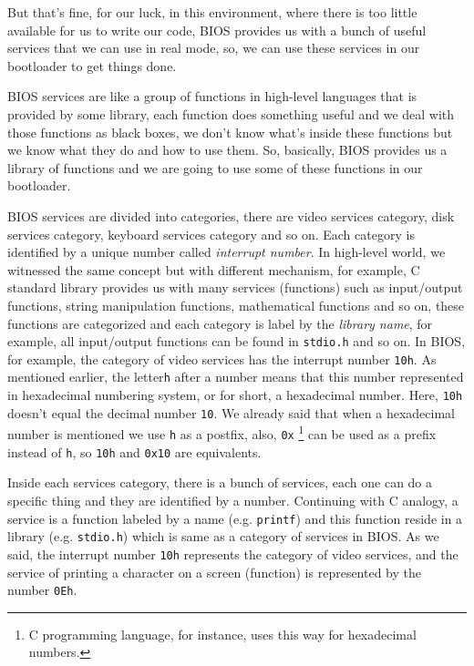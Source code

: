 But that's fine, for our luck, in this environment, where there is too
little available for us to write our code, BIOS provides us with a bunch
of useful services that we can use in real mode, so, we can use these
services in our bootloader to get things done.

BIOS services are like a group of functions in high-level languages that
is provided by some library, each function does something useful and we
deal with those functions as black boxes, we don't know what's inside
these functions but we know what they do and how to use them. So,
basically, BIOS provides us a library of functions and we are going to
use some of these functions in our bootloader.

BIOS services are divided into categories, there are video services
category, disk services category, keyboard services category and so on.
Each category is identified by a unique number called \emph{interrupt
number}. In high-level world, we witnessed the same concept but with
different mechanism, for example, C standard library provides us with
many services (functions) such as input/output functions, string
manipulation functions, mathematical functions and so on, these
functions are categorized and each category is label by the
\emph{library name}, for example, all input/output functions can be
found in \lstinline!stdio.h! and so on. In BIOS, for example, the
category of video services has the interrupt number \lstinline!10h!. As
mentioned earlier, the letter\lstinline!h! after a number means that
this number represented in hexadecimal numbering system, or for short, a
hexadecimal number. Here, \lstinline!10h! doesn't equal the decimal
number \lstinline!10!. We already said that when a hexadecimal number is
mentioned we use \lstinline!h! as a postfix, also, \lstinline!0x!
\footnote{C programming language, for instance, uses this way for
  hexadecimal numbers.} can be used as a prefix instead of
\lstinline!h!, so \lstinline!10h! and \lstinline!0x10! are equivalents.

Inside each services category, there is a bunch of services, each one
can do a specific thing and they are identified by a number. Continuing
with C analogy, a service is a function labeled by a name (e.g.
\lstinline!printf!) and this function reside in a library (e.g.
\lstinline!stdio.h!) which is same as a category of services in BIOS. As
we said, the interrupt number \lstinline!10h! represents the category of
video services, and the service of printing a character on a screen
(function) is represented by the number \lstinline!0Eh!.


